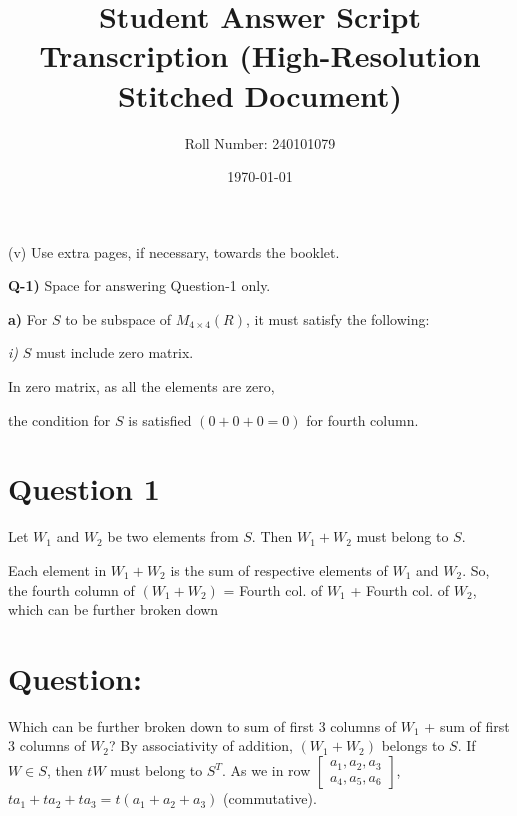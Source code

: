 \documentclass[12pt]{article}
\title{Student Answer Script Transcription (High-Resolution Stitched Document)}
\author{Roll Number: 240101079}
\date{\today}
\begin{document}
\maketitle

(v) Use extra pages, if necessary, towards the booklet.

\textbf{Q-1)} Space for answering Question-1 only.

\textbf{a)} For $S$ to be subspace of $M_{4\times4}(R)$, it must satisfy the following:

\textit{i)} $S$ must include zero matrix.

In zero matrix, as all the elements are zero,

the condition for $S$ is satisfied $(0+0+0=0)$ for fourth column.

\section*{Question 1}

Let $W_{1}$ and $W_{2}$ be two elements from $S$. Then $W_{1} + W_{2}$ must belong to $S$.

Each element in $W_{1} + W_{2}$ is the sum of respective elements of $W_{1}$ and $W_{2}$. So, the fourth column of $(W_{1} + W_{2})$ = Fourth col. of $W_{1}$ + Fourth col. of $W_{2}$, which can be further broken down

\section*{Question:}
Which can be further broken down to sum of first 3 columns of $W_{1}$ + sum of first 3 columns of $W_{2}$? By associativity of addition, $(W_{1}+W_{2})$ belongs to $S$. If $W \in S$, then $tW$ must belong to $S^{T}$. As we in row $\left[\begin{array}{ccc}a_{1}, a_{2}, a_{3}\\a_{4}, a_{5}, a_{6}\end{array}\right]$, $ta_{1}+ta_{2}+ta_{3}=t(a_{1}+a_{2}+a_{3})$ (commutative).
\end{document}
